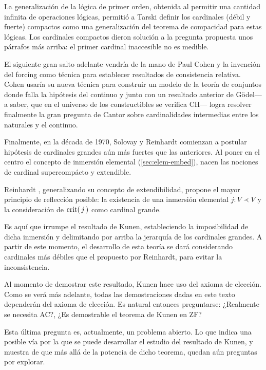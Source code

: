 La generalización de la lógica de primer orden, obtenida al
permitir una cantidad infinita de operaciones lógicas,
permitió a Tarski \autocite{tarski_problems_1966} definir los cardinales (débil y fuerte)
compactos como una generalización del teorema de compacidad
para estas lógicas. Los cardinales compactos dieron solución
a la pregunta propuesta unos párrafos más arriba:
el primer cardinal inaccesible no es medible.

El siguiente gran salto adelante vendría de la mano de
Paul Cohen \autocite{cohen_independence_1963,cohen_independence_1964}
y la invención del forcing como técnica
para establecer resultados de consistencia relativa.
Cohen usaría su nueva técnica para construir un modelo de la
teoría de conjuntos donde falla la hipótesis del continuo
y junto con un resultado anterior de Gödel---a saber, que
en el universo de los constructibles se verifica CH---%
logra resolver finalmente la gran pregunta de Cantor sobre cardinalidades
intermedias entre los naturales y el continuo.

Finalmente, en la década de 1970,
Solovay y Reinhardt comienzan a postular
hipótesis de cardinales grandes aún más fuertes
que las anteriores.
Al poner en el centro el concepto de inmersión elemental
(\cref{sec:elem-embed}),
nacen las nociones de cardinal supercompácto y extendible.

Reinhardt \autocite{reinhardt_ackermanns_1970},
generalizando su concepto de extendibilidad,
propone el mayor principio de reflección posible:
la existencia de una inmersión elemental $j\colon V\prec V$
y la consideración de $\operatorname{crit} (\, j\, )$ como cardinal grande.

Es aquí que irrumpe el resultado de Kunen,
estableciendo la imposibilidad de dicha inmersión
y delimitando por arriba la jerarquía de los cardinales
grandes. A partir de este momento, el desarrollo
de esta teoría se dará considerando cardinales más
débiles que el propuesto por Reinhardt,
para evitar la inconsistencia.

Al momento de demostrar este resultado, Kunen hace
uso del axioma de elección. Como se verá
más adelante, todas las demostraciones dadas en este texto
dependerán del axioma de elección.
Es natural entonces preguntarse: ¿Realmente se necesita AC?,
¿Es demostrable el teorema de Kunen en ZF?

Esta última pregunta es, actualmente, un problema abierto.
Lo que indica una posible vía por la que se puede desarrollar
el estudio del resultado de Kunen, y muestra de que más allá
de la potencia de dicho teorema, quedan aún preguntas por explorar.

